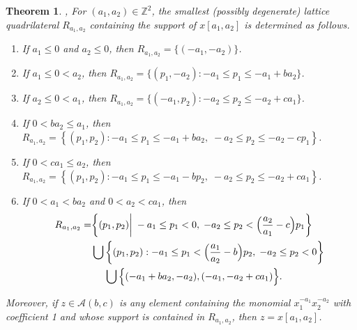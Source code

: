 \documentclass[11pt]{amsart}
\newtheorem{theorem}{Theorem}[section]
\theoremstyle{remark}
\numberwithin{equation}{section}
\newcommand{\ZZ}{\mathbb{Z}}
\newcommand{\cA}{\mathcal{A}}
\begin{document}
\begin{theorem}\label{th:Newton polygons}\cite[Proposition~4.1]{LLZ}, \cite[Corollary~3.5]{LLZ2}
  For $(a_1,a_2)\in\ZZ^2$, the smallest (possibly degenerate) lattice quadrilateral $R_{a_1,a_2}$ containing the support of $x[a_1,a_2]$ is determined as follows.
  \begin{enumerate}
    \item If $a_1 \leq 0$ and $a_2 \leq 0$, then $R_{a_1,a_2} = \{(-a_1,-a_2)\}$.
    \item If $a_1 \leq 0 < a_2$, then $R_{a_1,a_2} = \{(p_1,-a_2): -a_1\leq p_1\leq -a_1+ba_2\}$.
    \item If $a_2 \leq 0 < a_1$, then $R_{a_1,a_2} = \{(-a_1,p_2): -a_2 \leq p_2 \leq -a_2+ca_1\}$.
    \item If $0<ba_2\leq a_1$, then $R_{a_1,a_2}=\left\{(p_1,p_2): -a_1\le p_1\le -a_1+ba_2,\; -a_2\le p_2\le -a_2-cp_1\right\}$.
    \item If $0<ca_1\leq a_2$, then $R_{a_1,a_2}=\left\{(p_1,p_2): -a_1\le p_1\le -a_1-bp_2,\; -a_2\le p_2\le -a_2+ca_1\right\}$.
    \item If $0 < a_1 < ba_2$ and $0 < a_2 < ca_1$, then
    $$\aligned
    R_{a_1,a_2}=&\bigg\{(p_1,p_2)\bigg|\; -a_1\le p_1<0,\; -a_2\le p_2<\Big(\frac{a_2}{a_1}-c\Big)p_1\bigg\}\\
    &\bigcup\bigg\{(p_1,p_2): -a_1\le p_1<\Big(\frac{a_1}{a_2}-b\Big)p_2,\; -a_2\le p_2<0\bigg\}\\
    &\hspace{1.35em}\bigcup\Big\{(-a_1+ba_2,-a_2),(-a_1,-a_2+ca_1)\Big\}.
    \endaligned
    $$
  \end{enumerate}
  Moreover, if $z\in\cA(b,c)$ is any element containing the monomial $x_1^{-a_1}x_2^{-a_2}$ with coefficient 1 and whose support is contained in $R_{a_1,a_2}$, then $z=x[a_1,a_2]$. 
\end{theorem}
\end{document}
